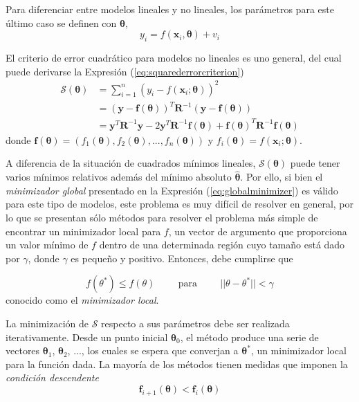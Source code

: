 Para diferenciar entre modelos lineales y no lineales, los parámetros para este último caso se definen con $\bm{\theta}$,
\begin{equation}
    y_i = f(\bm{x}_i, \bm{\theta}) + v_i
    \label{eq:nonlinearregressionmodel}
\end{equation}

El criterio de error cuadrático para modelos no lineales es uno general, del cual puede derivarse la Expresión (\ref{eq:squarederrorcriterion})
\begin{align}
    \mathscr{S}(\bm{\theta}) &= \sum_{i=1}^n (y_i - f(\bm{x}_i;\bm{\theta}))^2 \\
                   &= (\bm{y} - \bm{f}(\bm{\theta}))^T\bm{R}^{-1}(\bm{y} - \bm{f}(\bm{\theta})) \\
                   &= \bm{y}^T \bm{R}^{-1}\bm{y} - 2\bm{y}^T\bm{R}^{-1}\bm{f}(\bm{\theta}) + \bm{f}(\bm{\theta})^T\bm{R}^{-1}\bm{f}(\bm{\theta})
    \label{eq:generalsquarederrorcriterion}
\end{align}
donde $\bm{f}(\bm{\theta}) = (f_1(\bm{\theta}), f_2(\bm{\theta}), ..., f_n(\bm{\theta}))$ y $f_i(\bm{\theta}) = f(\bm{x}_i;\bm{\theta})$.

A diferencia de la situación de cuadrados mínimos lineales, $\mathscr{S}(\bm{\theta})$ puede tener varios mínimos relativos además del mínimo absoluto $\hat{\bm{\theta}}$. Por ello, si bien el \textit{minimizador global} presentado en la Expresión (\ref{eq:globalminimizer}) es válido para este tipo de modelos, este problema es muy difícil de resolver en general, por lo que se presentan sólo métodos para resolver el problema más simple de encontrar un minimizador local para $f$, un vector de argumento que proporciona un valor mínimo de $f$ dentro de una determinada región cuyo tamaño está dado por $\gamma$, donde $\gamma$ es pequeño y positivo. Entonces, debe cumplirse que

\begin{equation}
    f(\theta^*) \leq f(\theta)\hspace{1cm}\text{para}\hspace{1cm}||\theta - \theta^*|| < \gamma
    \label{eq:localminimizer}
\end{equation}
conocido como el \textit{minimizador local}.

La minimización de $\mathscr{S}$ respecto a sus parámetros debe ser realizada iterativamente.
Desde un punto inicial $\bm{\theta}_0$, el método produce una serie de vectores $\bm{\theta}_1$, $\bm{\theta}_2$, ..., los cuales se espera que converjan a $\bm{\theta}^*$, un minimizador local para la función dada. La mayoría de los métodos tienen medidas que imponen la \textit{condición descendente}
\begin{equation}
    \bm{f}_{i+1}(\bm{\theta}) < \bm{f}_{i}(\bm{\theta})
    \label{eq:descendingcondition}
\end{equation}

